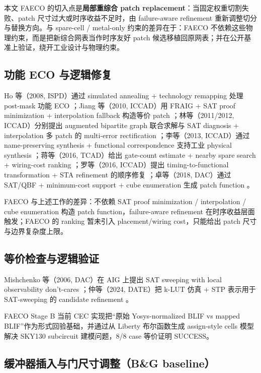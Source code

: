 \documentclass[journal]{IEEEtran}
\begin{document}
本文 FAECO 的切入点是\textbf{局部重综合 patch replacement}：当固定权重切割失败、patch 尺寸过大或时序收益不足时，由 failure-aware refinement 重新调整切分与替换方向。与 spare-cell / metal-only 约束的差异在于：FAECO 不依赖这些物理约束，而是把新综合网表当作时序友好 patch 候选移植回原网表；并在公开基准上验证，绕开工业设计与物理约束。

\subsection{功能 ECO 与逻辑修复}

Ho 等（2008, ISPD）通过 simulated annealing + technology remapping 处理 post-mask 功能 ECO \cite{ho2008ecomap}；Jiang 等（2010, ICCAD）用 FRAIG + SAT proof minimization + interpolation fallback 构造等价 patch \cite{jiang2010fraig}；林等（2011/2012, ICCAD）分别提出 augmented bipartite graph 联合求解与 SAT diagnosis + interpolation 多 patch 的 multi-error rectification \cite{lin2011simult,lin2012multipatch}；李等（2013, ICCAD）通过 name-preserving synthesis + functional correspondence 支持工业 physical synthesis \cite{li2013intuitive}；蒋等（2016, TCAD）给出 gate-count estimate + nearby spare search + wiring-cost ranking \cite{jiang2016resource}；罗等（2016, ICCAD）提出 timing-to-functional transformation + STA refinement 的顺序修复 \cite{luo2016unified}；卓等（2018, DAC）通过 SAT/QBF + minimum-cost support + cube enumeration 生成 patch function \cite{zhuo2018patch}。

FAECO 与上述工作的差异：不依赖 SAT proof minimization / interpolation / cube enumeration 构造 patch function，failure-aware refinement 在时序收益层面触发；FAECO 的 ranking 暂未引入 placement/wiring cost，只能给出 patch 尺寸与边界复杂度上限。

\subsection{等价检查与逻辑验证}

Mishchenko 等（2006, DAC）在 AIG 上提出 SAT sweeping with local observability don't-cares \cite{mishchenko2006sat}；仲等（2024, DATE）把 k-LUT 仿真 + STP 表示用于 SAT-sweeping 的 candidate refinement \cite{zhong2024stp}。

FAECO Stage B 当前 CEC 实现把“原始 Yosys-normalized BLIF vs mapped BLIF”作为形式回验基础，并通过从 Liberty 布尔函数生成 assign-style cells 模型解决 SKY130 subcircuit 建模问题，8/8 case 等价证明 SUCCESS。

\subsection{缓冲器插入与门尺寸调整（B\&G baseline）}
\end{document}
